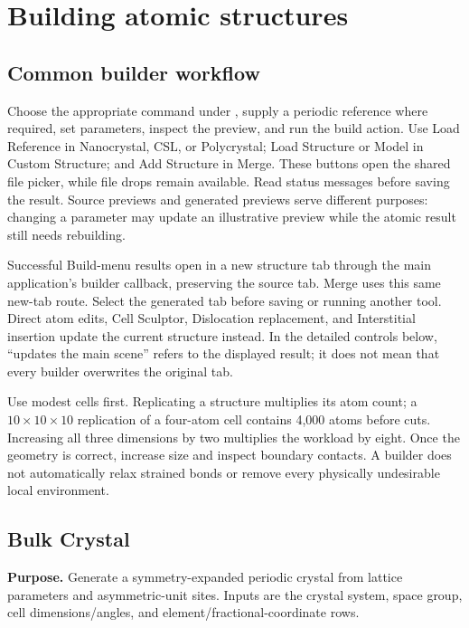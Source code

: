 \chapter{Building atomic structures}\label{ch:builders}
\section{Common builder workflow}
Choose the appropriate command under , supply a periodic reference where required, set parameters, inspect the preview, and run the build action. Use Load Reference in Nanocrystal, CSL, or Polycrystal; Load Structure or Model in Custom Structure; and Add Structure in Merge. These buttons open the shared file picker, while file drops remain available. Read status messages before saving the result. Source previews and generated previews serve different purposes: changing a parameter may update an illustrative preview while the atomic result still needs rebuilding.

Successful Build-menu results open in a new structure tab through the main application's builder callback, preserving the source tab. Merge uses this same new-tab route. Select the generated tab before saving or running another tool. Direct atom edits, Cell Sculptor, Dislocation replacement, and Interstitial insertion update the current structure instead. In the detailed controls below, ``updates the main scene'' refers to the displayed result; it does not mean that every builder overwrites the original tab.

Use modest cells first. Replicating a structure multiplies its atom count; a $10\times10\times10$ replication of a four-atom cell contains 4,000 atoms before cuts. Increasing all three dimensions by two multiplies the workload by eight. Once the geometry is correct, increase size and inspect boundary contacts. A builder does not automatically relax strained bonds or remove every physically undesirable local environment.

\section{Bulk Crystal}
\textbf{Purpose.} Generate a symmetry-expanded periodic crystal from lattice parameters and asymmetric-unit sites. Inputs are the crystal system, space group, cell dimensions/angles, and element/fractional-coordinate rows.

